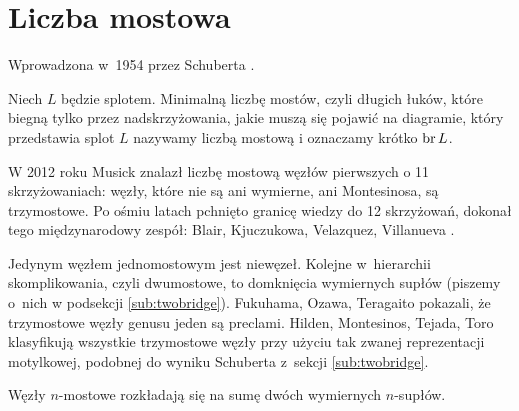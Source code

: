 
\section{Liczba mostowa}
%

Wprowadzona w~1954 przez Schuberta \cite{schubert1954}.
%

\begin{definition}
    Niech $L$ będzie splotem.
    Minimalną liczbę mostów, czyli długich łuków, które biegną tylko przez nadskrzyżowania, jakie muszą się pojawić na diagramie, który przedstawia splot $L$ nazywamy liczbą mostową i oznaczamy krótko $\operatorname{br} L$.
\end{definition}

W 2012 roku Musick \cite{musick2012} znalazł liczbę mostową węzłów pierwszych o 11 skrzyżowaniach: węzły, które nie są ani wymierne, ani Montesinosa, są trzymostowe.
%
Po ośmiu latach pchnięto granicę wiedzy do 12 skrzyżowań, dokonał tego międzynarodowy zespół: Blair, Kjuczukowa, Velazquez, Villanueva \cite{blair2020}.
%
%
%
%

Jedynym węzłem jednomostowym jest niewęzeł.
Kolejne w~hierarchii skomplikowania, czyli dwumostowe, to domknięcia wymiernych supłów (piszemy o~nich w podsekcji \ref{sub:twobridge}).
Fukuhama, Ozawa, Teragaito \cite{fukuhama1999} pokazali, że trzymostowe węzły genusu jeden są preclami.
%
%
%
%
%
%
Hilden, Montesinos, Tejada, Toro \cite{hilden2012} klasyfikują wszystkie trzymostowe węzły przy użyciu tak zwanej reprezentacji motylkowej, podobnej do wyniku Schuberta z~sekcji \ref{sub:twobridge}.
%
%
%
%
%
%
%

\begin{proposition}
    Węzły $n$-mostowe rozkładają się na sumę dwóch wymiernych $n$-supłów.
\end{proposition}
%

